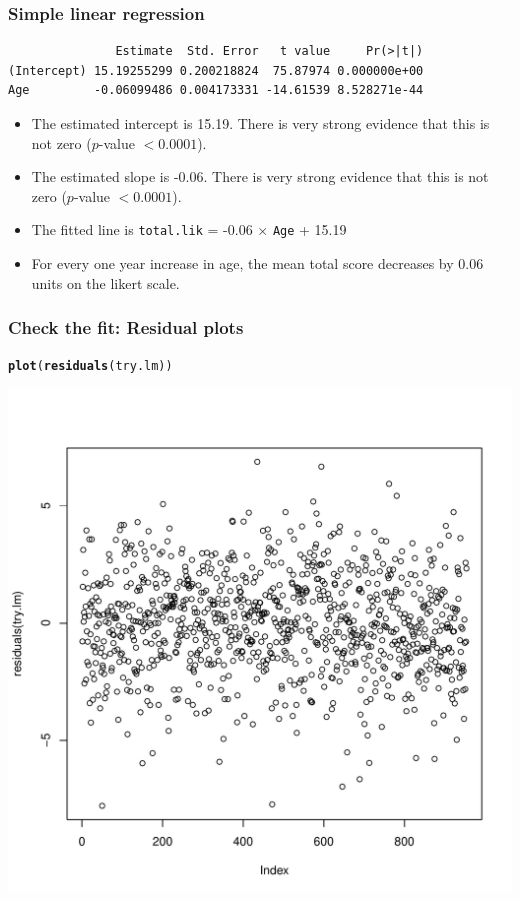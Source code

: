 \documentclass{beamer}\usepackage[]{graphicx}\usepackage[]{color}
\makeatletter
\newcommand{\hlstd}[1]{\textcolor[rgb]{0.345,0.345,0.345}{#1}}%
\newcommand{\hlkwd}[1]{\textcolor[rgb]{0.737,0.353,0.396}{\textbf{#1}}}%
\newenvironment{kframe}{%
 \def\at@end@of@kframe{}%
 \ifinner\ifhmode%
  \def\at@end@of@kframe{\end{minipage}}%
  \begin{minipage}{\columnwidth}%
 \fi\fi%
 \def\FrameCommand##1{\hskip\@totalleftmargin \hskip-\fboxsep
 \colorbox{shadecolor}{##1}\hskip-\fboxsep
     \hskip-\linewidth \hskip-\@totalleftmargin \hskip\columnwidth}%
 \MakeFramed {\advance\hsize-\width
   \@totalleftmargin\z@ \linewidth\hsize
   \@setminipage}}%
 {\par\unskip\endMakeFramed%
 \at@end@of@kframe}
\newenvironment{knitrout}{}{} %
\makeatother
\begin{document}
\begin{frame}[fragile]
\frametitle{Simple linear regression}
\begin{knitrout}
\color{fgcolor}\begin{kframe}
\begin{verbatim}
               Estimate  Std. Error   t value     Pr(>|t|)
(Intercept) 15.19255299 0.200218824  75.87974 0.000000e+00
Age         -0.06099486 0.004173331 -14.61539 8.528271e-44
\end{verbatim}
\end{kframe}
\end{knitrout}
\begin{itemize}
\item The estimated intercept is 15.19. There is very strong evidence that this is not zero ($p$-value $< 0.0001$).
\item The estimated slope is -0.06. There is very strong evidence that this is not zero ($p$-value $< 0.0001$).
\item The fitted line is \texttt{total.lik} = -0.06 $\times$ \texttt{Age} + 15.19
\item For every one year increase in age, the mean total score decreases by 0.06 units on the likert scale.
\end{itemize}
\end{frame} 

\begin{frame}[fragile]
\frametitle{Check the fit: Residual plots}
\begin{knitrout}
\color{fgcolor}\begin{kframe}
\begin{alltt}
\hlkwd{plot}\hlstd{(}\hlkwd{residuals}\hlstd{(try.lm))}
\end{alltt}
\end{kframe}

{\centering \includegraphics[width=0.6\linewidth]{figure/unnamed-chunk-6-1} 

}



\end{knitrout}
\end{frame} 
\end{document}
